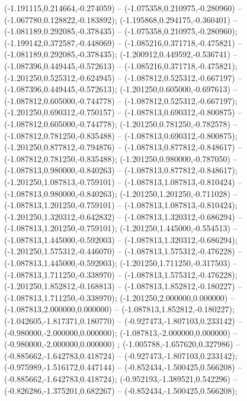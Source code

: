  (-1.191115,0.214664,-0.274059) -- (-1.075358,0.210975,-0.280960) -- (-1.067780,0.128822,-0.183892);
 (-1.195868,0.294175,-0.360401) -- (-1.081189,0.292085,-0.378435) -- (-1.075358,0.210975,-0.280960);
 (-1.199142,0.372587,-0.448069) -- (-1.085216,0.371718,-0.475821) -- (-1.081189,0.292085,-0.378435);
 (-1.200912,0.449592,-0.536741) -- (-1.087396,0.449445,-0.572613) -- (-1.085216,0.371718,-0.475821);
 (-1.201250,0.525312,-0.624945) -- (-1.087812,0.525312,-0.667197) -- (-1.087396,0.449445,-0.572613);
 (-1.201250,0.605000,-0.697613) -- (-1.087812,0.605000,-0.744778) -- (-1.087812,0.525312,-0.667197);
 (-1.201250,0.690312,-0.750157) -- (-1.087813,0.690312,-0.800875) -- (-1.087812,0.605000,-0.744778);
 (-1.201250,0.781250,-0.782578) -- (-1.087812,0.781250,-0.835488) -- (-1.087813,0.690312,-0.800875);
 (-1.201250,0.877812,-0.794876) -- (-1.087813,0.877812,-0.848617) -- (-1.087812,0.781250,-0.835488);
 (-1.201250,0.980000,-0.787050) -- (-1.087813,0.980000,-0.840263) -- (-1.087813,0.877812,-0.848617);
 (-1.201250,1.087813,-0.759101) -- (-1.087813,1.087813,-0.810424) -- (-1.087813,0.980000,-0.840263);
 (-1.201250,1.201250,-0.711028) -- (-1.087813,1.201250,-0.759101) -- (-1.087813,1.087813,-0.810424);
 (-1.201250,1.320312,-0.642832) -- (-1.087813,1.320312,-0.686294) -- (-1.087813,1.201250,-0.759101);
 (-1.201250,1.445000,-0.554513) -- (-1.087813,1.445000,-0.592003) -- (-1.087813,1.320312,-0.686294);
 (-1.201250,1.575312,-0.446070) -- (-1.087813,1.575312,-0.476228) -- (-1.087813,1.445000,-0.592003);
 (-1.201250,1.711250,-0.317503) -- (-1.087813,1.711250,-0.338970) -- (-1.087813,1.575312,-0.476228);
 (-1.201250,1.852812,-0.168813) -- (-1.087813,1.852812,-0.180227) -- (-1.087813,1.711250,-0.338970);
 (-1.201250,2.000000,0.000000) -- (-1.087813,2.000000,0.000000) -- (-1.087813,1.852812,-0.180227);
 (-1.042605,-1.817371,0.180770) -- (-0.927473,-1.807103,0.233142) -- (-0.980000,-2.000000,0.000000);
 (-1.087813,-2.000000,0.000000) -- (-0.980000,-2.000000,0.000000) ;
 (-1.005788,-1.657620,0.327986) -- (-0.885662,-1.642783,0.418724) -- (-0.927473,-1.807103,0.233142);
 (-0.975989,-1.516172,0.447144) -- (-0.852434,-1.500425,0.566208) -- (-0.885662,-1.642783,0.418724);
 (-0.952193,-1.389521,0.542296) -- (-0.826286,-1.375201,0.682267) -- (-0.852434,-1.500425,0.566208);
